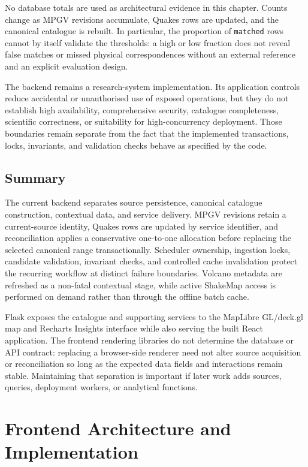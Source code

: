 \documentclass[12pt]{article}
\begin{document}
No database totals are used as architectural evidence in this chapter. Counts change as MPGV revisions accumulate, Quakes rows are updated, and the canonical catalogue is rebuilt. In particular, the proportion of \texttt{matched} rows cannot by itself validate the thresholds: a high or low fraction does not reveal false matches or missed physical correspondences without an external reference and an explicit evaluation design.

The backend remains a research-system implementation. Its application controls reduce accidental or unauthorised use of exposed operations, but they do not establish high availability, comprehensive security, catalogue completeness, scientific correctness, or suitability for high-concurrency deployment. Those boundaries remain separate from the fact that the implemented transactions, locks, invariants, and validation checks behave as specified by the code.

\subsection{Summary}

The current backend separates source persistence, canonical catalogue construction, contextual data, and service delivery. MPGV revisions retain a current-source identity, Quakes rows are updated by service identifier, and reconciliation applies a conservative one-to-one allocation before replacing the selected canonical range transactionally. Scheduler ownership, ingestion locks, candidate validation, invariant checks, and controlled cache invalidation protect the recurring workflow at distinct failure boundaries. Volcano metadata are refreshed as a non-fatal contextual stage, while active ShakeMap access is performed on demand rather than through the offline batch cache.

Flask exposes the catalogue and supporting services to the MapLibre GL/deck.gl map and Recharts Insights interface while also serving the built React application. The frontend rendering libraries do not determine the database or API contract: replacing a browser-side renderer need not alter source acquisition or reconciliation so long as the expected data fields and interactions remain stable. Maintaining that separation is important if later work adds sources, queries, deployment workers, or analytical functions.

\newpage

\section{Frontend Architecture and Implementation}
\label{sec:frontend}
\end{document}

